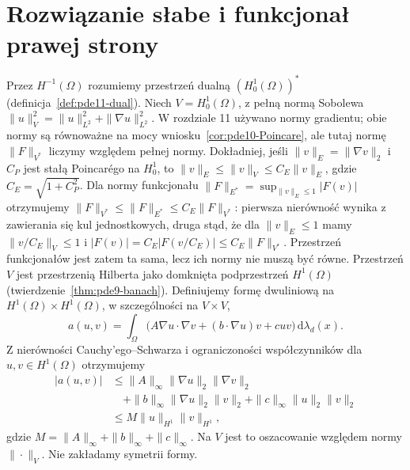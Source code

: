 \section{Rozwiązanie słabe i funkcjonał prawej strony}
\label{sec:pde13-weak}
Przez $H^{-1}(\Omega)$ rozumiemy przestrzeń dualną
$(H_0^1(\Omega))^*$ (definicja~\ref{def:pde11-dual}).
Niech $V=H_0^1(\Omega)$, z pełną normą Sobolewa
$\|u\|_V^2=\|u\|_{L^2}^2+\|\nabla u\|_{L^2}^2$.
W rozdziale 11 używano normy gradientu; obie normy są
równoważne na mocy wniosku~\ref{cor:pde10-Poincare},
ale tutaj normę $\|F\|_{V^*}$ liczymy względem pełnej normy.
Dokładniej, jeśli $\|v\|_E=\|\nabla v\|_2$ i $C_P$ jest
stałą Poincarégo na $H_0^1$, to
$\|v\|_E\le\|v\|_V\le C_E\|v\|_E$,
gdzie $C_E=\sqrt{1+C_P^2}$. Dla normy funkcjonału
$\|F\|_{E^*}=\sup_{\|v\|_E\le1}|F(v)|$ otrzymujemy
$\|F\|_{V^*}\le\|F\|_{E^*}\le C_E\|F\|_{V^*}$:
pierwsza nierówność wynika z zawierania się kul jednostkowych,
druga stąd, że dla $\|v\|_E\le1$ mamy
$\|v/C_E\|_V\le1$ i
$|F(v)|=C_E|F(v/C_E)|\le C_E\|F\|_{V^*}$.
Przestrzeń funkcjonałów jest zatem ta sama, lecz ich normy
nie muszą być równe.
Przestrzeń $V$ jest przestrzenią Hilberta jako domknięta
podprzestrzeń $H^1(\Omega)$
(twierdzenie~\ref{thm:pde9-banach}).
Definiujemy formę dwuliniową na $H^1(\Omega)\times H^1(\Omega)$,
w szczególności na $V\times V$,
\begin{equation}\label{eq:pde13-form}
 a(u,v)=\int_\Omega\big(A\nabla u\cdot\nabla v
 +(b\cdot\nabla u)v+cuv\big)\,\mathrm d\lambda_d(x).
\end{equation}
Z nierówności Cauchy'ego--Schwarza i ograniczoności
współczynników dla $u,v\in H^1(\Omega)$ otrzymujemy
\begin{align*}
 |a(u,v)|&\le \|A\|_\infty\|\nabla u\|_2\|\nabla v\|_2\\
 &\quad+\|b\|_\infty\|\nabla u\|_2\|v\|_2
 +\|c\|_\infty\|u\|_2\|v\|_2\\
 &\le M\|u\|_{H^1}\|v\|_{H^1},
\end{align*}
gdzie $M=\|A\|_\infty+\|b\|_\infty+\|c\|_\infty$.
Na $V$ jest to oszacowanie względem normy $\|\cdot\|_V$.
Nie zakładamy symetrii formy.

